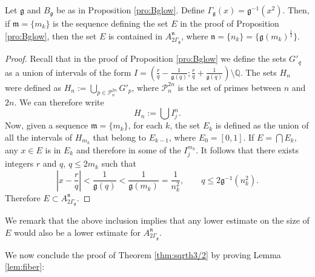 \documentclass[11pt,a4paper]{amsart}
\begin{document}
\begin{lemma}\label{lem:EksubAf}
Let ${\mathfrak{g}}$ and $B_{\mathfrak{g}}$ be as in Proposition \ref{pro:Bglow}. Define
$\Gamma_{\mathfrak{g}}(x)={\mathfrak{g}}^{-1}(x^2)$. Then, if ${\mathfrak{m}}=\{m_k\}$ is the
sequence defining the set $E$ in the proof of
Proposition \ref{pro:Bglow}, then the set $E$ is contained in
$A^{\mathfrak{n}}_{2\Gamma_{\mathfrak{g}}}$, where ${\mathfrak{n}}=\{n_k\}=\{{\mathfrak{g}}(m_k)^\frac{1}{2}\}$.
\end{lemma}
\begin{proof}
 Recall that in the proof of Proposition \ref{pro:Bglow} we define the sets $G'_q$ as a union of intervals of the form $I=\left(\frac{r}{q}-\frac{1}{{\mathfrak{g}}(q)};\frac{r}{q}+\frac{1}{{\mathfrak{g}}(q)}\right)\setminus {\mathbb{Q}}$. The sets $H_n$ were defined as $   H_n:=\bigcup_{p\in\mathcal{P}_n^{2n}}G'_p$, where $\mathcal{P}_n^{2n}$ is the set of primes between $n$ and $2n$. We can therefore write
 \begin{equation*}
   H_n:=\bigcup I^n_j.
 \end{equation*}
Now, given a sequence ${\mathfrak{m}}=\{m_k\}$, for each $k$, the set $E_k$
is defined as the union of all the intervals of $H_{m_k}$ that
belong to $E_{k-1}$, where $E_0=[0,1]$. If $E=\bigcap E_k$, any
$x\in E$ is in $E_k$ and therefore in some of the $I_j^{m_k}$. It
follows that there exists integers $r$ and $q$, $q\le 2m_k$ such
that
\begin{equation*}
 \left|x-\frac{r}{q}\right|<\frac{1}{{\mathfrak{g}}(q)}<\frac{1}{{\mathfrak{g}}(m_k)}=\frac{1}{n_k^2},\qquad q\le 2{\mathfrak{g}}^{-1}(n_k^2).
\end{equation*}
Therefore $E\subset A_{2\Gamma_{\mathfrak{g}}}^{\mathfrak{n}}$.
\end{proof}

We remark that the above inclusion implies that any lower estimate on the size of $E$ would also be a lower estimate for
$A_{2\Gamma_{\mathfrak{g}}}^{\mathfrak{n}}$. 

We now conclude the proof of Theorem \ref{thm:sqrth3/2} by proving Lemma \ref{lem:fiber}: 
\end{document}
